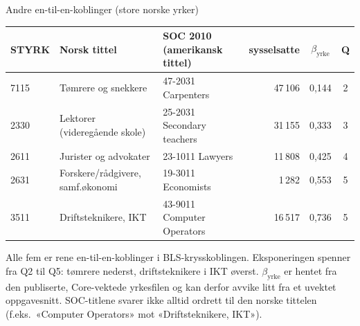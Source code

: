 
\begin{frame}{Andre en-til-en-koblinger (store norske yrker)}
\centering\footnotesize
\setlength{\tabcolsep}{4pt}
\begin{tabular}{llp{4.4cm}rcc}
\toprule
STYRK & Norsk tittel & SOC 2010 (amerikansk tittel) & sysselsatte & $\beta_{\text{yrke}}$ & Q \\
\midrule
7115 & Tømrere og snekkere               & 47-2031 Carpenters                  & 47\,106 & 0,144 & 2 \\
2330 & Lektorer (videregående skole)     & 25-2031 Secondary teachers          & 31\,155 & 0,333 & 3 \\
2611 & Jurister og advokater             & 23-1011 Lawyers                     & 11\,808 & 0,425 & 4 \\
2631 & Forskere/rådgivere, samf.økonomi  & 19-3011 Economists                  &  1\,282 & 0,553 & 5 \\
3511 & Driftsteknikere, IKT              & 43-9011 Computer Operators          & 16\,517 & 0,736 & 5 \\
\bottomrule
\end{tabular}

\vspace{1em}
Alle fem er rene en-til-en-koblinger i BLS-krysskoblingen. Eksponeringen spenner fra Q2 til Q5: tømrere nederst, driftsteknikere i IKT øverst. $\beta_{\text{yrke}}$ er hentet fra den publiserte, Core-vektede yrkesfilen og kan derfor avvike litt fra et uvektet oppgavesnitt. SOC-titlene svarer ikke alltid ordrett til den norske tittelen (f.eks.\ «Computer Operators» mot «Driftsteknikere, IKT»).
\end{frame}
